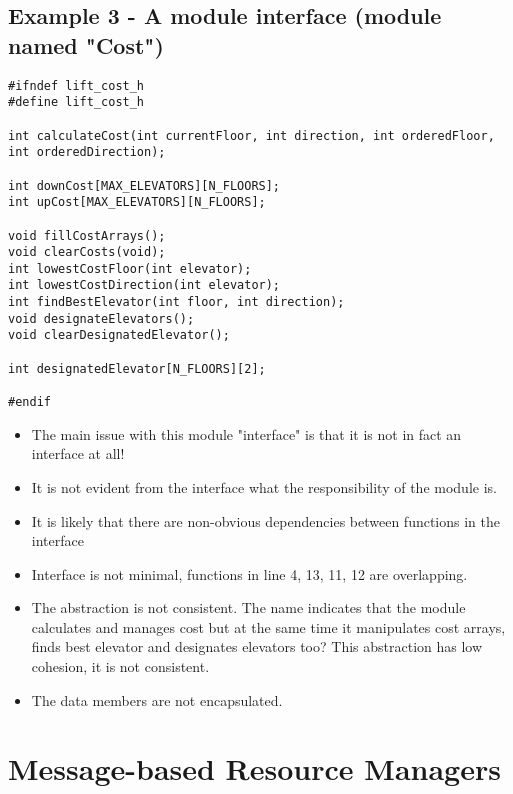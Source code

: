 \subsection{Example 3 - A module interface (module named "Cost")}
\begin{verbatim}
#ifndef lift_cost_h
#define lift_cost_h

int calculateCost(int currentFloor, int direction, int orderedFloor, int orderedDirection);

int downCost[MAX_ELEVATORS][N_FLOORS];
int upCost[MAX_ELEVATORS][N_FLOORS];

void fillCostArrays();
void clearCosts(void);
int lowestCostFloor(int elevator);
int lowestCostDirection(int elevator);
int findBestElevator(int floor, int direction);
void designateElevators();
void clearDesignatedElevator();

int designatedElevator[N_FLOORS][2];

#endif
\end{verbatim}
\begin{itemize}
\item The main issue with this module "interface" is that it is not in fact an interface at all!
\item It is not evident from the interface what the responsibility of the module is.
\item It is likely that there are non-obvious dependencies between functions in the interface
\item Interface is not minimal, functions in line 4, 13, 11, 12 are overlapping. 
\item The abstraction is not consistent. The name indicates that the module calculates and manages cost but at the same time it manipulates cost arrays, finds best elevator and designates elevators too? This abstraction has low cohesion, it is not consistent.
\item The data members are not encapsulated.
\end{itemize}

\newpage
\section{Message-based Resource Managers}

